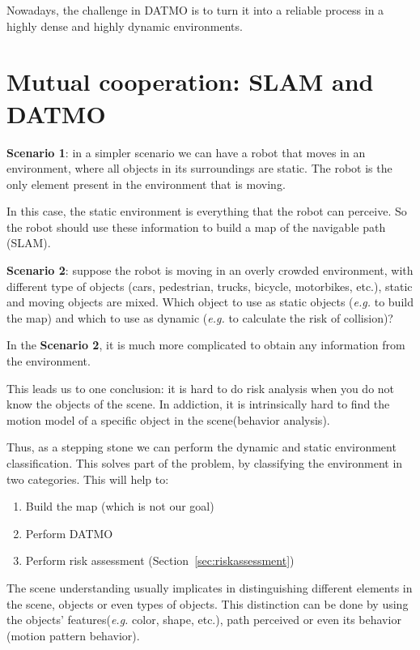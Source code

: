 Nowadays, the challenge in DATMO is to turn it into a reliable process in a highly dense and highly dynamic environments.

\section{Mutual cooperation: SLAM and DATMO}

\textbf{Scenario 1}: in a simpler scenario we can have a robot that moves in an environment, where all objects in its surroundings are static. The robot is the only element present in the environment that is moving.

In this case, the static environment is everything that the robot can perceive. So the robot should use these information to build a map of the navigable path (SLAM).

\textbf{Scenario 2}: suppose the robot is moving in an overly crowded environment, with different type of objects (cars, pedestrian, trucks, bicycle, motorbikes, etc.), static and moving objects are mixed. Which object to use as static objects (\textit{e.g.} to build the map) and which to use as dynamic (\textit{e.g.} to calculate the risk of collision)? 

In the \textbf{Scenario 2}, it is much more complicated to obtain any information from the environment.

This leads us to one conclusion: it is hard to do risk analysis when you do not know the objects of the scene. In addiction, it is intrinsically hard to find the motion model of a specific object in the scene(behavior analysis).

Thus, as a stepping stone we can perform the dynamic and static environment classification. This solves part of the problem, by classifying the environment in two categories. This will help to:

\begin{enumerate}
\item Build the map (which is not our goal)
\item Perform DATMO
\item Perform risk assessment (Section~\ref{sec:riskassessment})
\end{enumerate}

The scene understanding usually implicates in distinguishing different elements in the scene, objects or even types of objects. This distinction can be done by using the objects' features(\textit{e.g.} color, shape, etc.), path perceived or even its behavior (motion pattern behavior). 

